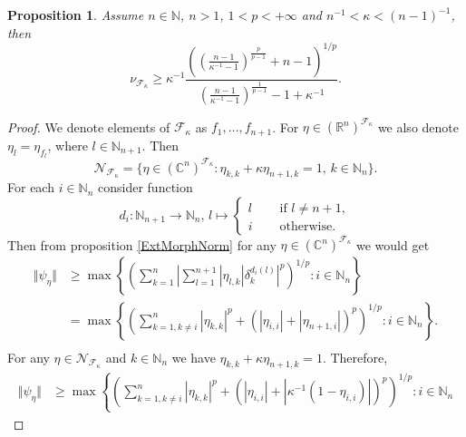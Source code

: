 \documentclass[12pt]{article}
\newtheorem{proposition}[theorem]{Proposition}
\begin{document}
\begin{proposition}\label{ExtMorphsNormLwrBnd}
    Assume $n\in\mathbb{N}$, $n>1$, $1<p<+\infty$ 
    and $n^{-1}<\kappa<(n-1)^{-1}$, then
    \[
        \nu_{\mathcal{F}_{\kappa}}
        \geq 
        \kappa^{-1}\frac{
            \left(
                \left(\frac{n-1}{\kappa^{-1}-1}\right)^{\frac{p}{p-1}}+n-1
            \right)^{1/p}
        }{
            \left(\frac{n-1}{\kappa^{-1}-1}\right)^{\frac{1}{p-1}}-1+\kappa^{-1}
        }.
    \]
\end{proposition}
\begin{proof}
    We denote elements of $\mathcal{F}_{\kappa}$ as $f_1,\ldots,f_{n+1}$. For
    $\eta\in(\mathbb{R}^n)^{\mathcal{F}_{\kappa}}$ we also 
    denote $\eta_l=\eta_{f_l}$, where $l\in\mathbb{N}_{n+1}$. Then
    \[
        \mathcal{N}_{\mathcal{F}_{\kappa}}=\{
            \eta\in(\mathbb{C}^{n})^{\mathcal{F}_{\kappa}}:
            \eta_{k,k}+\kappa \eta_{n+1, k}=1,\, k\in\mathbb{N}_n
        \}.
    \]
    For each $i\in\mathbb{N}_n$ consider function
    \[
        d_i:\mathbb{N}_{n+1}\to\mathbb{N}_n,\,
        l\mapsto
        \begin{cases}
            l\quad &\mbox{ if }l\neq n+1,\\
            i\quad &\mbox{ otherwise. }
        \end{cases}
    \]
    Then from proposition \ref{ExtMorphNorm} for 
    any $\eta\in(\mathbb{C}^n)^{\mathcal{F}_{\kappa}}$ we would get
    \[
    \begin{aligned}
        \Vert\psi_{\eta}\Vert
        &\geq\max\left\{
            \left(\sum_{k=1}^n
                \left|\sum_{l=1}^{n+1}|\eta_{l,k}|\delta_{k}^{d_i(l)}\right|^p
            \right)^{1/p}:
            i\in\mathbb{N}_n
        \right\} \\
        &=\max\left\{
            \left(
                \sum_{k=1,k\neq i}^n |\eta_{k,k}|^p+
                (|\eta_{i,i}|+|\eta_{n+1,i}|)^p
            \right)^{1/p}:
            i\in\mathbb{N}_n
        \right\}. \\
    \end{aligned}
    \]
    For any $\eta\in\mathcal{N}_{\mathcal{F}_{\kappa}}$ 
    and $k\in\mathbb{N}_n$ we have $\eta_{k,k}+\kappa \eta_{n+1, k}=1$. 
    Therefore,
    \[
    \begin{aligned}
        \Vert \psi_{\eta}\Vert
        &\geq\max\left\{
            \left(
                \sum_{k=1,k\neq i}^n |\eta_{k,k}|^p+
                (|\eta_{i,i}|+|\kappa^{-1}(1-\eta_{i,i})|)^p
            \right)^{1/p}:
            i\in\mathbb{N}_n

\end{aligned}\]
\end{proof}
\end{document}
